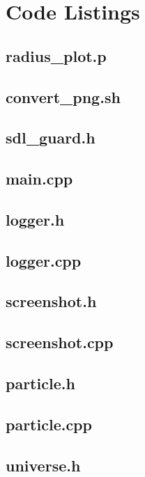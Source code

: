 \documentclass[10pt,a4paper]{article}
\begin{document}
\clearpage
{}
\section{Code Listings}
\subsection{radius\_plot.p}

\subsection{convert\_png.sh}

\subsection{sdl\_guard.h}

\clearpage
\subsection{main.cpp}

\clearpage
\subsection{logger.h}

\subsection{logger.cpp}

\clearpage
\subsection{screenshot.h}

\subsection{screenshot.cpp}

\clearpage
\subsection{particle.h}

\subsection{particle.cpp}

\clearpage
\subsection{universe.h}

\end{document}
